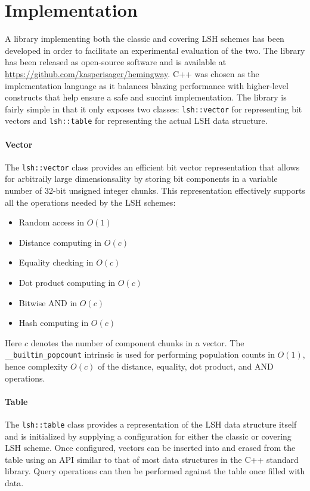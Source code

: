 \section{Implementation}
\label{implementation}

A library implementing both the classic and covering LSH schemes has been developed in order to facilitate an experimental evaluation of the two. The library has been released as open-source software and is available at \url{https://github.com/kasperisager/hemingway}. C++ was chosen as the implementation language as it balances blazing performance with higher-level constructs that help ensure a safe and succint implementation. The library is fairly simple in that it only exposes two classes: \texttt{lsh::vector} for representing bit vectors and \texttt{lsh::table} for representing the actual LSH data structure.

\paragraph{Vector} The \texttt{lsh::vector} class provides an efficient bit vector representation that allows for arbitraily large dimensionsality by storing bit components in a variable number of 32-bit unsigned integer chunks. This representation effectively supports all the operations needed by the LSH schemes:

\begin{itemize}
  \item Random access in $O(1)$
  \item Distance computing in $O(c)$
  \item Equality checking in $O(c)$
  \item Dot product computing in $O(c)$
  \item Bitwise AND in $O(c)$
  \item Hash computing in $O(c)$
\end{itemize}

Here $c$ denotes the number of component chunks in a vector. The \texttt{\_\_builtin\_popcount} intrinsic is used for performing population counts in $O(1)$, hence complexity $O(c)$ of the distance, equality, dot product, and AND operations.

\paragraph{Table} The \texttt{lsh::table} class provides a representation of the LSH data structure itself and is initialized by supplying a configuration for either the classic or covering LSH scheme. Once configured, vectors can be inserted into and erased from the table using an API similar to that of most data structures in the C++ standard library. Query operations can then be performed against the table once filled with data.

